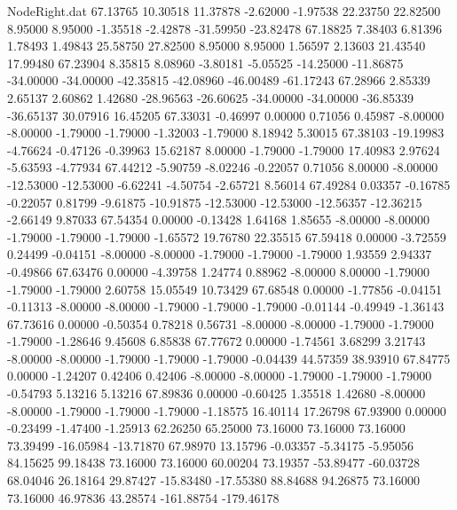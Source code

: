 \begin{filecontents}{NodeRight.dat}
  67.13765   10.30518   11.37878    -2.62000   -1.97538   22.23750   22.82500    8.95000    8.95000   -1.35518   -2.42878  -31.59950  -23.82478
  67.18825    7.38403    6.81396     1.78493    1.49843   25.58750   27.82500    8.95000    8.95000    1.56597    2.13603   21.43540   17.99480
  67.23904    8.35815    8.08960    -3.80181   -5.05525  -14.25000  -11.86875  -34.00000  -34.00000  -42.35815  -42.08960  -46.00489  -61.17243
  67.28966    2.85339    2.65137     2.60862    1.42680  -28.96563  -26.60625  -34.00000  -34.00000  -36.85339  -36.65137   30.07916   16.45205
  67.33031   -0.46997    0.00000     0.71056    0.45987   -8.00000   -8.00000   -1.79000   -1.79000   -1.32003   -1.79000    8.18942    5.30015
  67.38103  -19.19983   -4.76624    -0.47126   -0.39963   15.62187    8.00000   -1.79000   -1.79000   17.40983    2.97624   -5.63593   -4.77934
  67.44212   -5.90759   -8.02246    -0.22057    0.71056    8.00000   -8.00000  -12.53000  -12.53000   -6.62241   -4.50754   -2.65721    8.56014
  67.49284    0.03357   -0.16785    -0.22057    0.81799   -9.61875  -10.91875  -12.53000  -12.53000  -12.56357  -12.36215   -2.66149    9.87033
  67.54354    0.00000   -0.13428     1.64168    1.85655   -8.00000   -8.00000   -1.79000   -1.79000   -1.79000   -1.65572   19.76780   22.35515
  67.59418    0.00000   -3.72559     0.24499   -0.04151   -8.00000   -8.00000   -1.79000   -1.79000   -1.79000    1.93559    2.94337   -0.49866
  67.63476    0.00000   -4.39758     1.24774    0.88962   -8.00000    8.00000   -1.79000   -1.79000   -1.79000    2.60758   15.05549   10.73429
  67.68548    0.00000   -1.77856    -0.04151   -0.11313   -8.00000   -8.00000   -1.79000   -1.79000   -1.79000   -0.01144   -0.49949   -1.36143
  67.73616    0.00000   -0.50354     0.78218    0.56731   -8.00000   -8.00000   -1.79000   -1.79000   -1.79000   -1.28646    9.45608    6.85838
  67.77672    0.00000   -1.74561     3.68299    3.21743   -8.00000   -8.00000   -1.79000   -1.79000   -1.79000   -0.04439   44.57359   38.93910
  67.84775    0.00000   -1.24207     0.42406    0.42406   -8.00000   -8.00000   -1.79000   -1.79000   -1.79000   -0.54793    5.13216    5.13216
  67.89836    0.00000   -0.60425     1.35518    1.42680   -8.00000   -8.00000   -1.79000   -1.79000   -1.79000   -1.18575   16.40114   17.26798
  67.93900    0.00000   -0.23499    -1.47400   -1.25913   62.26250   65.25000   73.16000   73.16000   73.16000   73.39499  -16.05984  -13.71870
  67.98970   13.15796   -0.03357    -5.34175   -5.95056   84.15625   99.18438   73.16000   73.16000   60.00204   73.19357  -53.89477  -60.03728
  68.04046   26.18164   29.87427   -15.83480  -17.55380   88.84688   94.26875   73.16000   73.16000   46.97836   43.28574 -161.88754 -179.46178

\end{filecontents}
